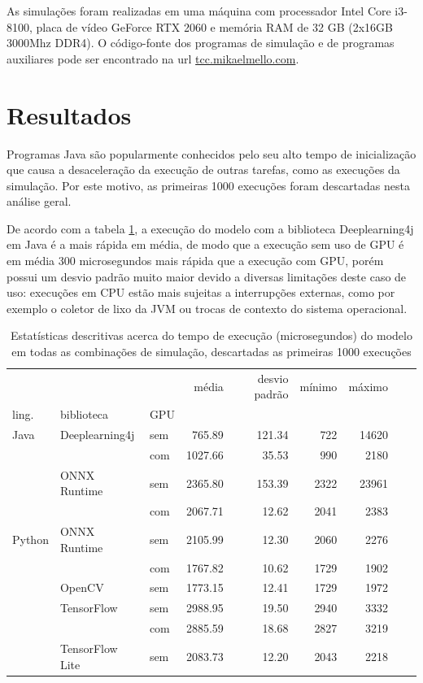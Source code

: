 As simulações foram realizadas em uma máquina com processador Intel Core i3-8100, placa de vídeo GeForce RTX 2060 e memória RAM de 32 GB (2x16GB 3000Mhz DDR4). O código-fonte dos programas de simulação e de programas auxiliares pode ser encontrado na url \url{tcc.mikaelmello.com}.

\section{Resultados}

Programas Java são popularmente conhecidos pelo seu alto tempo de inicialização que causa a desaceleração da execução de outras tarefas, como as execuções da simulação. Por este motivo, as primeiras 1000 execuções foram descartadas nesta análise geral.

De acordo com a tabela \ref{tab:all}, a execução do modelo com a biblioteca Deeplearning4j em Java é a mais rápida em média, de modo que a execução sem uso de GPU é em média 300 microsegundos mais rápida que a execução com GPU, porém possui um desvio padrão muito maior devido a diversas limitações deste caso de uso: execuções em CPU estão mais sujeitas a interrupções externas, como por exemplo o coletor de lixo da JVM ou trocas de contexto do sistema operacional.

\begin{table}
  \centering
  \begin{tabular}{lllrrrrrr}
    \toprule
           &                 &     & média   & desvio padrão & mínimo & máximo \\
    ling.  & biblioteca      & GPU &         &               &        &        \\
    \midrule
    Java   & Deeplearning4j  & sem & 765.89  & 121.34        & 722    & 14620  \\
           &                 & com & 1027.66 & 35.53         & 990    & 2180   \\
           & ONNX Runtime    & sem & 2365.80 & 153.39        & 2322   & 23961  \\
           &                 & com & 2067.71 & 12.62         & 2041   & 2383   \\
    Python & ONNX Runtime    & sem & 2105.99 & 12.30         & 2060   & 2276   \\
           &                 & com & 1767.82 & 10.62         & 1729   & 1902   \\
           & OpenCV          & sem & 1773.15 & 12.41         & 1729   & 1972   \\
           & TensorFlow      & sem & 2988.95 & 19.50         & 2940   & 3332   \\
           &                 & com & 2885.59 & 18.68         & 2827   & 3219   \\
           & TensorFlow Lite & sem & 2083.73 & 12.20         & 2043   & 2218   \\
    \bottomrule
  \end{tabular}
  \caption{Estatísticas descritivas acerca do tempo de execução (microsegundos) do modelo em todas as combinações de simulação, descartadas as primeiras 1000 execuções}
  \label{tab:all}
\end{table}

